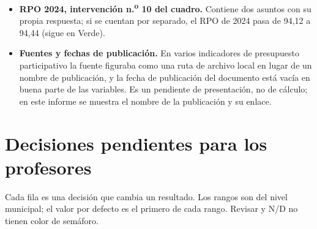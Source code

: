 \documentclass[11pt,letterpaper]{article}
\begin{document}
\begin{itemize}
\item \textbf{RPO 2024, intervención n.\textsuperscript{o} 10 del cuadro.} Contiene dos asuntos con su propia respuesta; si se cuentan por separado, el RPO de 2024 pasa de 94,12 a 94,44 (sigue en Verde).

\item \textbf{Fuentes y fechas de publicación.} En varios indicadores de presupuesto participativo la fuente figuraba como una ruta de archivo local en lugar de un nombre de publicación, y la fecha de publicación del documento está vacía en buena parte de las variables. Es un pendiente de presentación, no de cálculo; en este informe se muestra el nombre de la publicación y su enlace.

\end{itemize}

\section{Decisiones pendientes para los profesores}

Cada fila es una decisión que cambia un resultado. Los rangos son del nivel municipal; el valor por defecto es el primero de cada rango. \guillemotleft{}Revisar\guillemotright{} y N/D no tienen color de semáforo.
\end{document}
